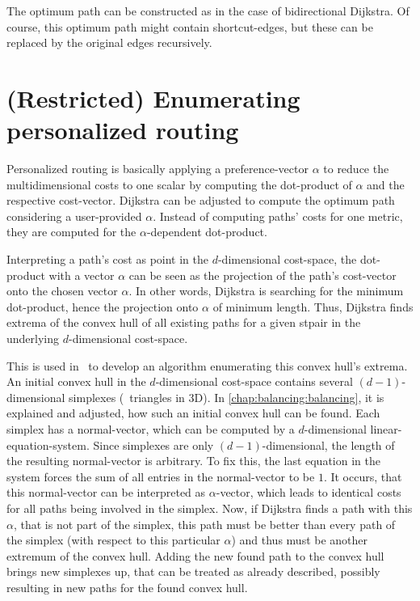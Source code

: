     The optimum path can be constructed as in the case of bidirectional Dijkstra.
    Of course, this optimum path might contain shortcut-edges, but these can be replaced by the original edges recursively.

\section{(Restricted) Enumerating personalized routing}

    Personalized routing is basically applying a preference-vector $\alpha$ to reduce the multidimensional costs to one scalar by computing the dot-product of $\alpha$ and the respective cost-vector.
    Dijkstra can be adjusted to compute the optimum path considering a user-provided $\alpha$.
    Instead of computing paths' costs for one metric, they are computed for the $\alpha$-dependent dot-product.

    Interpreting a path's cost as point in the $d$-dimensional cost-space, the dot-product with a vector $\alpha$ can be seen as the projection of the path's cost-vector onto the chosen vector $\alpha$.
    In other words, Dijkstra is searching for the minimum dot-product, hence the projection onto $\alpha$ of minimum length.
    Thus, Dijkstra finds extrema of the convex hull of all existing paths for a given \gls{stpair} in the underlying $d$-dimensional cost-space.

    This is used in~\cite{barth:alternative_multicriteria_routes} to develop an algorithm enumerating this convex hull's extrema.
    An initial convex hull in the $d$-dimensional cost-space contains several $(d-1)$-dimensional simplexes (\eg\ triangles in 3D).
    In \cref{chap:balancing:balancing}, it is explained and adjusted, how such an initial convex hull can be found.
    Each simplex has a normal-vector, which can be computed by a $d$-dimensional linear-equation-system.
    Since simplexes are only $(d-1)$-dimensional, the length of the resulting normal-vector is arbitrary.
    To fix this, the last equation in the system forces the sum of all entries in the normal-vector to be $1$.
    It occurs, that this normal-vector can be interpreted as $\alpha$-vector, which leads to identical costs for all paths being involved in the simplex.
    Now, if Dijkstra finds a path with this $\alpha$, that is not part of the simplex, this path must be better than every path of the simplex (with respect to this particular $\alpha$) and thus must be another extremum of the convex hull.
    Adding the new found path to the convex hull brings new simplexes up, that can be treated as already described, possibly resulting in new paths for the found convex hull.

